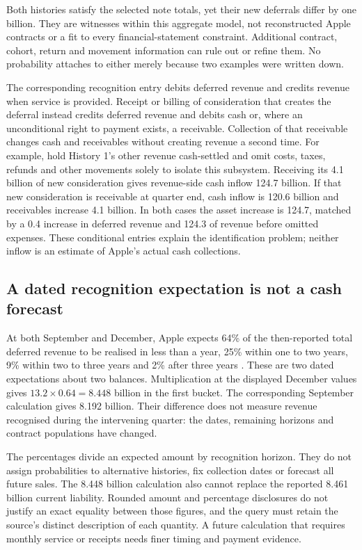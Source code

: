 Both histories satisfy the selected note totals, yet their new deferrals differ
by one billion. They are witnesses within this aggregate model, not reconstructed
Apple contracts or a fit to every financial-statement constraint. Additional
contract, cohort, return and movement information can rule out or refine them.
No probability attaches to either merely because two examples were written down.

The corresponding recognition entry debits deferred revenue and credits revenue
when service is provided. Receipt or billing of consideration that creates the
deferral instead credits deferred revenue and debits cash or, where an
unconditional right to payment exists, a receivable. Collection of that
receivable changes cash and receivables without creating revenue a second time.
For example, hold History 1's other revenue cash-settled and omit costs, taxes,
refunds and other movements solely to isolate this subsystem. Receiving its
4.1 billion of new consideration gives revenue-side cash inflow 124.7 billion.
If that new consideration is receivable at quarter end, cash inflow is 120.6
billion and receivables increase 4.1 billion. In both cases the asset increase
is 124.7, matched by a 0.4 increase in deferred revenue and 124.3 of revenue
before omitted expenses. These conditional entries explain the identification
problem; neither inflow is an estimate of Apple's actual cash collections.

\subsection{A dated recognition expectation is not a cash forecast}

At both September and December, Apple expects 64\% of the then-reported total
deferred revenue to be realised in less than a year, 25\% within one to two
years, 9\% within two to three years and 2\% after three years
\citep[Note 2, printed p.~36]{apple2024}
\citep[Note 2, printed p.~6]{apple2025q1}. These are two dated expectations
about two balances. Multiplication at the displayed December values gives
$13.2\times0.64=8.448$ billion in the first bucket. The corresponding September
calculation gives 8.192 billion. Their difference does not measure revenue
recognised during the intervening quarter: the dates, remaining horizons and
contract populations have changed.

The percentages divide an expected amount by recognition horizon. They do not
assign probabilities to alternative histories, fix collection dates or forecast
all future sales. The 8.448 billion calculation also cannot replace the reported
8.461 billion current liability. Rounded amount and percentage disclosures do
not justify an exact equality between those figures, and the query must retain
the source's distinct description of each quantity. A future calculation that
requires monthly service or receipts needs finer timing and payment evidence.

